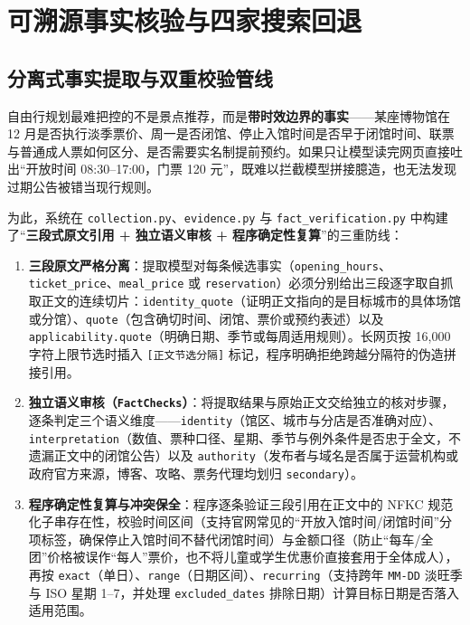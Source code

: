 \section{可溯源事实核验与四家搜索回退}

\subsection{分离式事实提取与双重校验管线}

自由行规划最难把控的不是景点推荐，而是\textbf{带时效边界的事实}——某座博物馆在 12 月是否执行淡季票价、周一是否闭馆、停止入馆时间是否早于闭馆时间、联票与普通成人票如何区分、是否需要实名制提前预约。如果只让模型读完网页直接吐出“开放时间 08:30--17:00，门票 120 元”，既难以拦截模型拼接臆造，也无法发现过期公告被错当现行规则。

为此，系统在 \texttt{collection.py}、\texttt{evidence.py} 与 \texttt{fact\_verification.py} 中构建了“\textbf{三段式原文引用 + 独立语义审核 + 程序确定性复算}”的三重防线：

\begin{enumerate}
  \item \textbf{三段原文严格分离}：提取模型对每条候选事实（\texttt{opening\_hours}、\texttt{ticket\_price}、\texttt{meal\_price} 或 \texttt{reservation}）必须分别给出三段逐字取自抓取正文的连续切片：\texttt{identity\_quote}（证明正文指向的是目标城市的具体场馆或分馆）、\texttt{quote}（包含确切时间、闭馆、票价或预约表述）以及 \texttt{applicability.quote}（明确日期、季节或每周适用规则）。长网页按 16,000 字符上限节选时插入 \texttt{[正文节选分隔]} 标记，程序明确拒绝跨越分隔符的伪造拼接引用。
  \item \textbf{独立语义审核（\texttt{FactChecks}）}：将提取结果与原始正文交给独立的核对步骤，逐条判定三个语义维度——\texttt{identity}（馆区、城市与分店是否准确对应）、\texttt{interpretation}（数值、票种口径、星期、季节与例外条件是否忠于全文，不遗漏正文中的闭馆公告）以及 \texttt{authority}（发布者与域名是否属于运营机构或政府官方来源，博客、攻略、票务代理均划归 \texttt{secondary}）。
  \item \textbf{程序确定性复算与冲突保全}：程序逐条验证三段引用在正文中的 NFKC 规范化子串存在性，校验时间区间（支持官网常见的“开放入馆时间/闭馆时间”分项标签，确保停止入馆时间不替代闭馆时间）与金额口径（防止“每车/全团”价格被误作“每人”票价，也不将儿童或学生优惠价直接套用于全体成人），再按 \texttt{exact}（单日）、\texttt{range}（日期区间）、\texttt{recurring}（支持跨年 \texttt{MM-DD} 淡旺季与 ISO 星期 1--7，并处理 \texttt{excluded\_dates} 排除日期）计算目标日期是否落入适用范围。
\end{enumerate}

